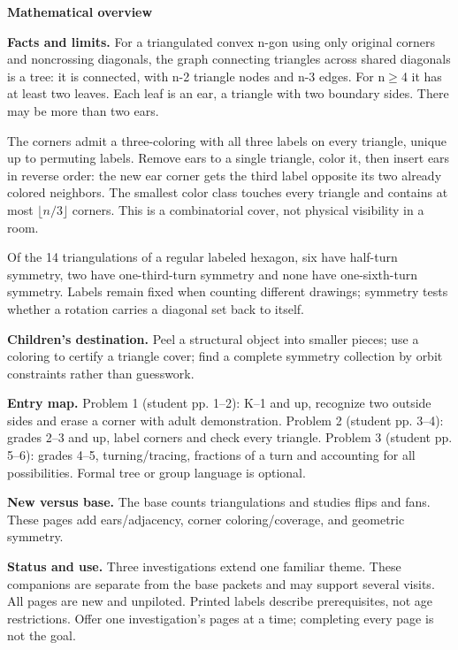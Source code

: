 \documentclass[11pt]{article}
\begin{document}
{\Large\bfseries Mathematical overview}\par\medskip
\textbf{Facts and limits.} For a triangulated convex n-gon using only original corners and noncrossing diagonals, the graph connecting triangles across shared diagonals is a tree: it is connected, with n-2 triangle nodes and n-3 edges. For n\(\geq\)4 it has at least two leaves. Each leaf is an ear, a triangle with two boundary sides. There may be more than two ears.

The corners admit a three-coloring with all three labels on every triangle, unique up to permuting labels. Remove ears to a single triangle, color it, then insert ears in reverse order: the new ear corner gets the third label opposite its two already colored neighbors. The smallest color class touches every triangle and contains at most \(\lfloor n/3\rfloor\) corners. This is a combinatorial cover, not physical visibility in a room.

Of the 14 triangulations of a regular labeled hexagon, six have half-turn symmetry, two have one-third-turn symmetry and none have one-sixth-turn symmetry. Labels remain fixed when counting different drawings; symmetry tests whether a rotation carries a diagonal set back to itself.

\textbf{Children's destination.} Peel a structural object into smaller pieces; use a coloring to certify a triangle cover; find a complete symmetry collection by orbit constraints rather than guesswork.

\textbf{Entry map.} Problem 1 (student pp. 1--2): K--1 and up, recognize two outside sides and erase a corner with adult demonstration. Problem 2 (student pp. 3--4): grades 2--3 and up, label corners and check every triangle. Problem 3 (student pp. 5--6): grades 4--5, turning/tracing, fractions of a turn and accounting for all possibilities. Formal tree or group language is optional.

\textbf{New versus base.} The base counts triangulations and studies flips and fans. These pages add ears/adjacency, corner coloring/coverage, and geometric symmetry.
\par\medskip
\textbf{Status and use.} Three investigations extend one familiar theme. These companions are separate from the base packets and may support several visits. All pages are new and unpiloted. Printed labels describe prerequisites, not age restrictions. Offer one investigation’s pages at a time; completing every page is not the goal.
\end{document}
